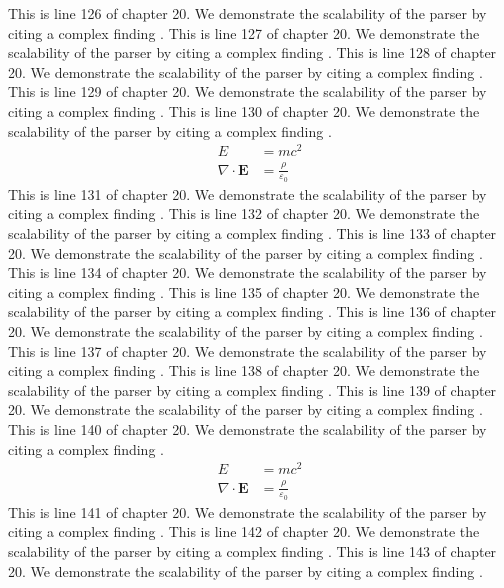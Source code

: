 This is line 126 of chapter 20. We demonstrate the scalability of the parser by citing a complex finding \cite{ref20_126}.
This is line 127 of chapter 20. We demonstrate the scalability of the parser by citing a complex finding \cite{ref20_127}.
This is line 128 of chapter 20. We demonstrate the scalability of the parser by citing a complex finding \cite{ref20_128}.
This is line 129 of chapter 20. We demonstrate the scalability of the parser by citing a complex finding \cite{ref20_129}.
This is line 130 of chapter 20. We demonstrate the scalability of the parser by citing a complex finding \cite{ref20_130}.
\begin{align*}
  E &= mc^2 \\
  \nabla \cdot \mathbf{E} &= \frac{\rho}{\varepsilon_0}
\end{align*}
This is line 131 of chapter 20. We demonstrate the scalability of the parser by citing a complex finding \cite{ref20_131}.
This is line 132 of chapter 20. We demonstrate the scalability of the parser by citing a complex finding \cite{ref20_132}.
This is line 133 of chapter 20. We demonstrate the scalability of the parser by citing a complex finding \cite{ref20_133}.
This is line 134 of chapter 20. We demonstrate the scalability of the parser by citing a complex finding \cite{ref20_134}.
This is line 135 of chapter 20. We demonstrate the scalability of the parser by citing a complex finding \cite{ref20_135}.
This is line 136 of chapter 20. We demonstrate the scalability of the parser by citing a complex finding \cite{ref20_136}.
This is line 137 of chapter 20. We demonstrate the scalability of the parser by citing a complex finding \cite{ref20_137}.
This is line 138 of chapter 20. We demonstrate the scalability of the parser by citing a complex finding \cite{ref20_138}.
This is line 139 of chapter 20. We demonstrate the scalability of the parser by citing a complex finding \cite{ref20_139}.
This is line 140 of chapter 20. We demonstrate the scalability of the parser by citing a complex finding \cite{ref20_140}.
\begin{align*}
  E &= mc^2 \\
  \nabla \cdot \mathbf{E} &= \frac{\rho}{\varepsilon_0}
\end{align*}
This is line 141 of chapter 20. We demonstrate the scalability of the parser by citing a complex finding \cite{ref20_141}.
This is line 142 of chapter 20. We demonstrate the scalability of the parser by citing a complex finding \cite{ref20_142}.
This is line 143 of chapter 20. We demonstrate the scalability of the parser by citing a complex finding \cite{ref20_143}.
